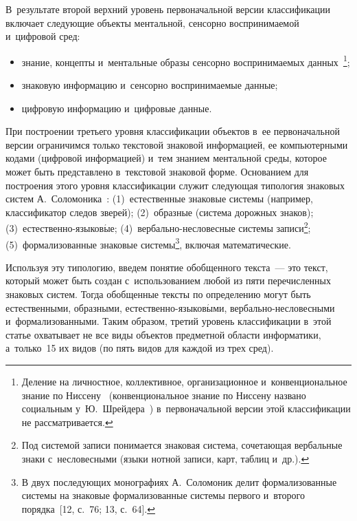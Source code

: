 \begin{multicols}{2}
    В~результате второй верхний уровень первоначальной версии 
классификации включает сле\-ду\-ющие объекты ментальной, сенсорно 
вос\-при\-ни\-ма\-емой и~циф\-ро\-вой сред:
    \begin{itemize}
\item знание, концепты и~ментальные образы сенсорно воспринимаемых 
данных~\cite{29-zac}\footnote{Деление на личностное, коллективное, организационное и~конвенциональное знание по Ниссену~\cite{30-zac} (конвенциональное знание по Ниссену 
названо социальным у~Ю.~Шрейдера~\cite{21-zac}) в~первоначальной версии этой 
классификации не рассматривается.};
\item знаковую информацию и~сенсорно воспринимаемые данные;
\item цифровую информацию и~цифровые данные.
\end{itemize}

    При построении третьего уровня классификации объектов в~ее 
первоначальной версии ограничимся только текстовой знаковой информацией, 
ее компьютерными кодами (цифровой информацией) и~тем знанием 
ментальной среды, которое может быть представлено в~текстовой знаковой 
форме. Основанием для построения этого уровня классификации служит 
следующая типология знаковых систем А.~Соломоника~\cite[c.~131]{31-zac}: 
(1)~естественные знаковые сис\-те\-мы (например, классификатор следов 
зверей); (2)~образные (сис\-те\-ма дорожных знаков);  
(3)~естест\-вен\-но-язы\-ко\-в$\acute{\mbox{ы}}$е;  
(4)~вер\-баль\-но-не\-сло\-вес\-ные сис\-те\-мы записи\footnote{Под системой записи 
понимается знаковая система, сочетающая вербальные знаки с~несловесными (языки нотной записи, 
карт, таблиц и~др.).}; (5)~формализованные знаковые системы\footnote{В двух 
последующих монографиях А.~Соломоник делит формализованные системы на знаковые 
формализованные системы первого и~второго порядка~[12, с.~76; 13, с.~64].}, включая 
математические.
    
    Используя эту типологию, введем понятие обобщенного текста~--- это 
текст, который может быть создан с~использованием любой из пяти 
пе\-ре\-чис\-лен\-ных знаковых сис\-тем. Тогда обобщенные текс\-ты по определению 
могут быть естественными, образными, естест\-вен\-но-язы\-ко\-в$\acute{\mbox{ы}}$\-ми, 
вер\-баль\-но-не\-сло\-вес\-ны\-ми и~формализованными. Таким образом, тре\-тий уровень 
классификации в~этой статье охватывает не все виды объектов предметной 
об\-ласти информатики, а~толь\-ко~15 их видов (по пять видов для каж\-дой из трех 
сред).
    

\end{multicols}
